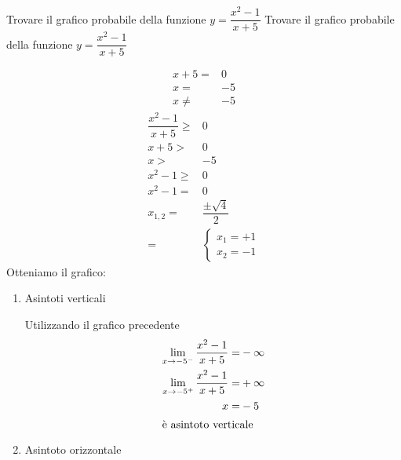 \begin{exercise}
	Trovare il grafico probabile della funzione $y=\dfrac{x^2-1}{x+5}$ 
	\tcblower
	Trovare il grafico probabile della funzione $y=\dfrac{x^2-1}{x+5}$ 
	\begin{itemize}
		\begin{align*}
		x+5=&0\\
		x=&-5\\
		x\neq&-5	
		\end{align*}
		\begin{align*}
	\dfrac{x^2-1}{x+5}\geq&0\\
	x+5>&0\\
	x>&-5\\
	x^2-1\geq&0\\
	x^2-1=&0\\
	x_{1,2}=&\dfrac{\pm\sqrt{4}}{2}\\
	=&\begin{cases}
	x_1=+1\\
	x_2=-1
	\end{cases}
		\end{align*}
		Otteniamo il grafico:
		\begin{center}
			
		\end{center}
		\begin{enumerate}
			\item Asintoti verticali
			
	Utilizzando il grafico precedente
	\begin{align*}
	\lim_{x\to -5^-}\dfrac{x^2-1}{x+5}=&-\infty\\
	\lim_{x\to -5^+}\dfrac{x^2-1}{x+5}=&+\infty\\
	x=&-5\\
	\intertext{è asintoto verticale}
	\end{align*}
			\item Asintoto orizzontale 
			

\end{enumerate}
\end{itemize}
\end{exercise}

